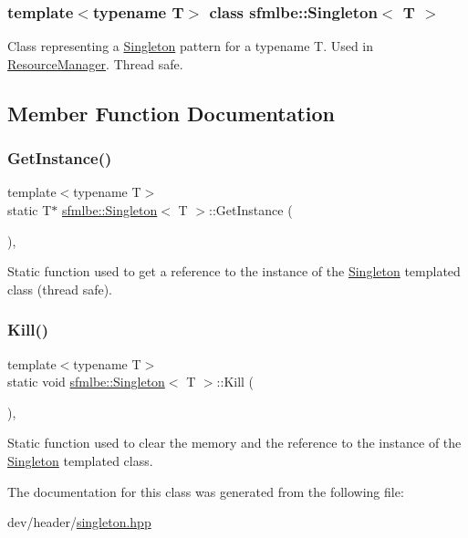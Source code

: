 \subsubsection*{template$<$typename T$>$\newline
class sfmlbe\+::\+Singleton$<$ T $>$}

Class representing a \mbox{\hyperlink{classsfmlbe_1_1_singleton}{Singleton}} pattern for a typename T. Used in \mbox{\hyperlink{classsfmlbe_1_1_resource_manager}{Resource\+Manager}}. Thread safe. 

\subsection{Member Function Documentation}
\mbox{\label{classsfmlbe_1_1_singleton_a313529b2a097425bf5500df8848ead3e}} 
\subsubsection{\texorpdfstring{Get\+Instance()}{GetInstance()}}
{\footnotesize\ttfamily template$<$typename T$>$ \\
static T$\ast$ \mbox{\hyperlink{classsfmlbe_1_1_singleton}{sfmlbe\+::\+Singleton}}$<$ T $>$\+::Get\+Instance (\begin{DoxyParamCaption}{ }\end{DoxyParamCaption})\hspace{0.3cm}{\ttfamily [inline]}, {\ttfamily [static]}}

Static function used to get a reference to the instance of the \mbox{\hyperlink{classsfmlbe_1_1_singleton}{Singleton}} templated class (thread safe). \mbox{\label{classsfmlbe_1_1_singleton_a0fa947a0f0940b94f757e49b56f37555}} 
\subsubsection{\texorpdfstring{Kill()}{Kill()}}
{\footnotesize\ttfamily template$<$typename T$>$ \\
static void \mbox{\hyperlink{classsfmlbe_1_1_singleton}{sfmlbe\+::\+Singleton}}$<$ T $>$\+::Kill (\begin{DoxyParamCaption}{ }\end{DoxyParamCaption})\hspace{0.3cm}{\ttfamily [inline]}, {\ttfamily [static]}}

Static function used to clear the memory and the reference to the instance of the \mbox{\hyperlink{classsfmlbe_1_1_singleton}{Singleton}} templated class. 

The documentation for this class was generated from the following file\+:\begin{DoxyCompactItemize}
\item 
dev/header/\mbox{\hyperlink{singleton_8hpp}{singleton.\+hpp}}\end{DoxyCompactItemize}
